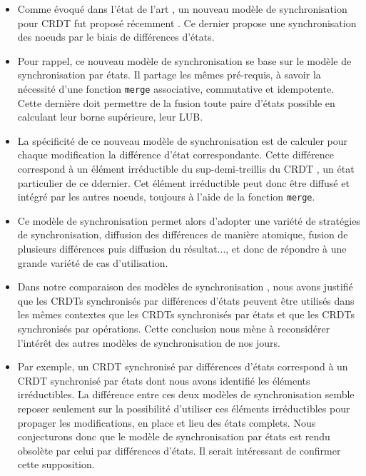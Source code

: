 \begin{itemize}
  \item Comme évoqué dans l'état de l'art , un nouveau modèle de synchronisation pour \ac{CRDT} fut proposé récemment \cite{almeida2015delta}.
    Ce dernier propose une synchronisation des noeuds par le biais de différences d'états.
  \item Pour rappel, ce nouveau modèle de synchronisation se base sur le modèle de synchronisation par états.
    Il partage les mêmes pré-requis, à savoir la nécessité d'une fonction \texttt{merge} associative, commutative et idempotente.
    Cette dernière doit permettre de la fusion toute paire d'états possible en calculant leur borne supérieure, \ie leur \ac{LUB}.
  \item La spécificité de ce nouveau modèle de synchronisation est de calculer pour chaque modification la différence d'état correspondante.
    Cette différence correspond à un élément irréductible du sup-demi-treillis du \ac{CRDT} \cite{enes2019}, \ie un état particulier de ce ddernier.
    Cet élément irréductible peut donc être diffusé et intégré par les autres noeuds, toujours à l'aide de la fonction \texttt{merge}.
  \item Ce modèle de synchronisation permet alors d'adopter une variété de stratégies de synchronisation, \eg diffusion des différences de manière atomique, fusion de plusieurs différences puis diffusion du résultat..., et donc de répondre à une grande variété de cas d'utilisation.
  \item Dans notre comparaison des modèles de synchronisation , nous avons justifié que les \acp{CRDT} synchronisés par différences d'états peuvent être utilisés dans les mêmes contextes que les \acp{CRDT} synchronisés par états et que les \acp{CRDT} synchronisés par opérations.
    Cette conclusion nous mène à reconsidérer l'intérêt des autres modèles de synchronisation de nos jours.
  \item Par exemple, un \ac{CRDT} synchronisé par différences d'états correspond à un \ac{CRDT} synchronisé par états dont nous avons identifié les éléments irréductibles.
    La différence entre ces deux modèles de synchronisation semble reposer seulement sur la possibilité d'utiliser ces éléments irréductibles pour propager les modifications, en place et lieu des états complets.
    Nous conjecturons donc que le modèle de synchronisation par états est rendu obsolète par celui par différences d'états.
    Il serait intéressant de confirmer cette supposition.

\end{itemize}
